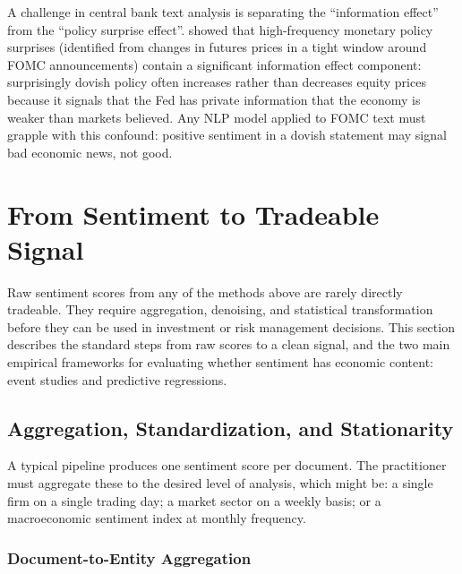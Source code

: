 A challenge in central bank text analysis is separating the ``information effect'' from the ``policy surprise effect''. \citet{nakamura2018high} showed that high-frequency monetary policy surprises (identified from changes in futures prices in a tight window around FOMC announcements) contain a significant information effect component: surprisingly dovish policy often increases rather than decreases equity prices because it signals that the Fed has private information that the economy is weaker than markets believed. Any NLP model applied to FOMC text must grapple with this confound: positive sentiment in a dovish statement may signal bad economic news, not good.

\section{From Sentiment to Tradeable Signal}
\label{sec:ch09-sentiment-to-signal}

\begin{context}

Raw sentiment scores from any of the methods above are rarely directly tradeable. They require aggregation, denoising, and statistical transformation before they can be used in investment or risk management decisions. This section describes the standard steps from raw scores to a clean signal, and the two main empirical frameworks for evaluating whether sentiment has economic content: event studies and predictive regressions.

\end{context}

\subsection{Aggregation, Standardization, and Stationarity}
\label{sec:ch09-aggregation-standardization}

A typical pipeline produces one sentiment score per document. The practitioner must aggregate these to the desired level of analysis, which might be: a single firm on a single trading day; a market sector on a weekly basis; or a macroeconomic sentiment index at monthly frequency.

\subsubsection*{Document-to-Entity Aggregation}

